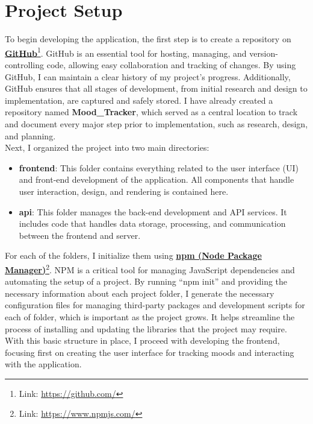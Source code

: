 \section{Project Setup}

To begin developing the application, the first step is to create a repository on \textbf{\href{https://github.com/}{GitHub}}\footnote{Link: \url{https://github.com/}}. GitHub is an essential tool for hosting, managing, and version-controlling code, allowing easy collaboration and tracking of changes. By using GitHub, I can maintain a clear history of my project's progress. Additionally, GitHub ensures that all stages of development, from initial research and design to implementation, are captured and safely stored. I have already created a repository named \textbf{Mood\_Tracker}, which served as a central location to track and document every major step prior to implementation, such as research, design, and planning.\vspace{5mm} \\
Next, I organized the project into two main directories:

\begin{itemize}
    \item \textbf{frontend}: This folder contains everything related to the user interface (UI) and front-end development of the application. All components that handle user interaction, design, and rendering is contained here.
    \item \textbf{api}: This folder manages the back-end development and API services. It includes code that handles data storage, processing, and communication between the frontend and server.
\end{itemize}

\noindent For each of the folders, I initialize them using \textbf{\href{https://www.npmjs.com/}{npm (Node Package Manager)}}\footnote{Link: \url{https://www.npmjs.com/}}. NPM is a critical tool for managing JavaScript dependencies and automating the setup of a project. By running ``npm init'' and providing the necessary information about each project folder, I generate the necessary configuration files for managing third-party packages and development scripts for each of folder, which is important as the project grows. It helps streamline the process of installing and updating the libraries that the project may require.\vspace{5mm} \\
With this basic structure in place, I proceed with developing the frontend, focusing first on creating the user interface for tracking moods and interacting with the application.

